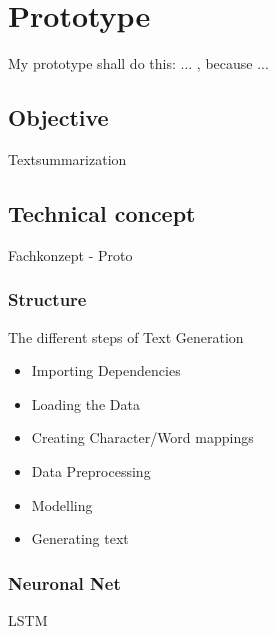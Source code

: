 \chapter{Prototype}\label{ch:proto}

My prototype shall do this: ... , because ...




%

\section{Objective}

Textsummarization

\section{Technical concept}

Fachkonzept - Proto

\subsection{Structure}

The different steps of Text Generation

\begin{itemize}
\item Importing Dependencies
\item Loading the Data
\item Creating Character/Word mappings
\item Data Preprocessing
\item Modelling
\item Generating text
\end{itemize}

\subsection{Neuronal Net}\label{ss:nn}

LSTM

